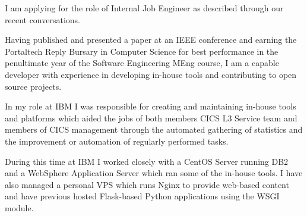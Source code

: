 \documentclass[10pt,stdletter,dateno,sigleft]{newlfm} %
\begin{document}
\begin{newlfm}




I am applying for the role of Internal Job Engineer as described through our recent conversations.


Having published and presented a paper at an IEEE conference and earning the
Portaltech Reply Bursary in Computer Science for best performance in the
penultimate year of the Software Engineering MEng course, I am a capable
developer with experience in developing in-house tools and contributing to
open source projects.

In my role at IBM I was responsible for creating and maintaining in-house tools and 
platforms which aided the jobs of both members CICS L3 Service team and members
of CICS management through the automated gathering of statistics and the 
improvement or automation of regularly performed tasks.

During this time at IBM I worked closely with a CentOS Server running DB2 and a WebSphere 
Application Server which ran some of the in-house tools. I have also managed a
personal VPS which runs Nginx to provide web-based content and have previous
hosted Flask-based Python applications using the WSGI module.


\end{newlfm}
\end{document}
